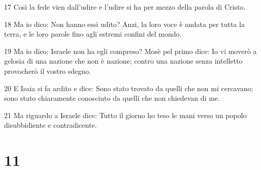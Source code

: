 \par 17 Così la fede vien dall'udire e l'udire si ha per mezzo della parola di Cristo.
\par 18 Ma io dico: Non hanno essi udito? Anzi, la loro voce è andata per tutta la terra, e le loro parole fino agli estremi confini del mondo.
\par 19 Ma io dico: Israele non ha egli compreso? Mosè pel primo dice: Io vi moverò a gelosia di una nazione che non è nazione; contro una nazione senza intelletto provocherò il vostro sdegno.
\par 20 E Isaia si fa ardito e dice: Sono stato trovato da quelli che non mi cercavano; sono stato chiaramente conosciuto da quelli che non chiedevan di me.
\par 21 Ma riguardo a Israele dice: Tutto il giorno ho teso le mani verso un popolo disubbidiente e contradicente.

\chapter{11}

